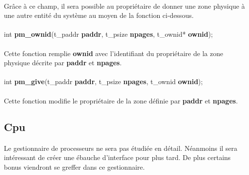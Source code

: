 \documentclass[10pt,a4wide]{article}
\begin{document}
\paragraph{}

Gr\^ace \`a ce champ, il sera possible au propri\'etaire de donner une zone
physique \`a une autre entit\'e du syst\`eme au moyen de la fonction
ci-dessous.

\paragraph{}

\hspace{1.5cm}int \textbf{pm\_ownid}(t\_paddr \textbf{paddr},
                                     t\_psize \textbf{npages},
                                     t\_ownid* \textbf{ownid});

\paragraph{}

Cette fonction remplie \textbf{ownid} avec l'identifiant du propri\'etaire
de la zone physique d\'ecrite par \textbf{paddr} et \textbf{npages}.

\paragraph{}

\hspace{1.5cm}int \textbf{pm\_give}(t\_paddr \textbf{paddr},
                                    t\_psize \textbf{npages},
                                    t\_ownid \textbf{ownid});

\paragraph{}

Cette fonction modifie le propri\'etaire de la zone d\'efinie par
\textbf{paddr} et \textbf{npages}.

\subsection{Cpu}

\paragraph{}

Le gestionnaire de processeurs ne sera pas \'etudi\'ee en d\'etail. N\'eanmoins
il sera int\'eressant de cr\'eer une \'ebauche d'interface pour plus tard.
De plus certains bonus viendront se greffer dans ce gestionnaire.
\end{document}
